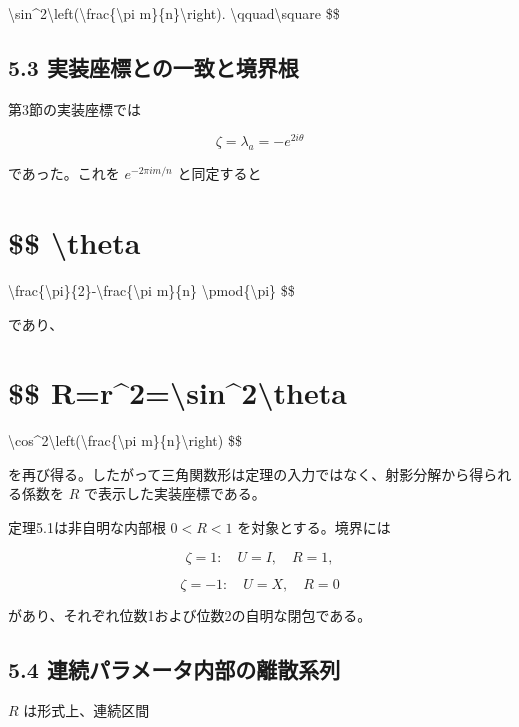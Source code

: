 \documentclass[
  a4paper,
  10pt]{article}
\begin{document}
\textbackslash sin\^{}2\textbackslash left(\textbackslash frac\{\textbackslash pi
m\}\{n\}\textbackslash right). \textbackslash qquad\textbackslash square
\$\$

\subsection{5.3
実装座標との一致と境界根}\label{53-ux5b9fux88c5ux5ea7ux6a19ux3068ux306eux4e00ux81f4ux3068ux5883ux754cux6839}

第3節の実装座標では

\[
\zeta=\lambda_a=-e^{2i\theta}
\]

であった。これを \(e^{-2\pi im/n}\) と同定すると

\section{\$\$ \textbackslash theta}\label{-theta}

\textbackslash frac\{\textbackslash pi\}\{2\}-\textbackslash frac\{\textbackslash pi
m\}\{n\} \textbackslash pmod\{\textbackslash pi\} \$\$

であり、

\section{\$\$
R=\textbar r\textbar\^{}2=\textbackslash sin\^{}2\textbackslash theta}\label{-rr2sin2theta}

\textbackslash cos\^{}2\textbackslash left(\textbackslash frac\{\textbackslash pi
m\}\{n\}\textbackslash right) \$\$

を再び得る。したがって三角関数形は定理の入力ではなく、射影分解から得られる係数を
\(R\) で表示した実装座標である。

定理5.1は非自明な内部根 \(0<R<1\) を対象とする。境界には

\[
\zeta=1:\quad U=I,\quad R=1,
\]

\[
\zeta=-1:\quad U=X,\quad R=0
\]

があり、それぞれ位数1および位数2の自明な閉包である。

\subsection{5.4
連続パラメータ内部の離散系列}\label{54-ux9023ux7d9aux30d1ux30e9ux30e1ux30fcux30bfux5185ux90e8ux306eux96e2ux6563ux7cfbux5217}

\(R\) は形式上、連続区間
\end{document}
